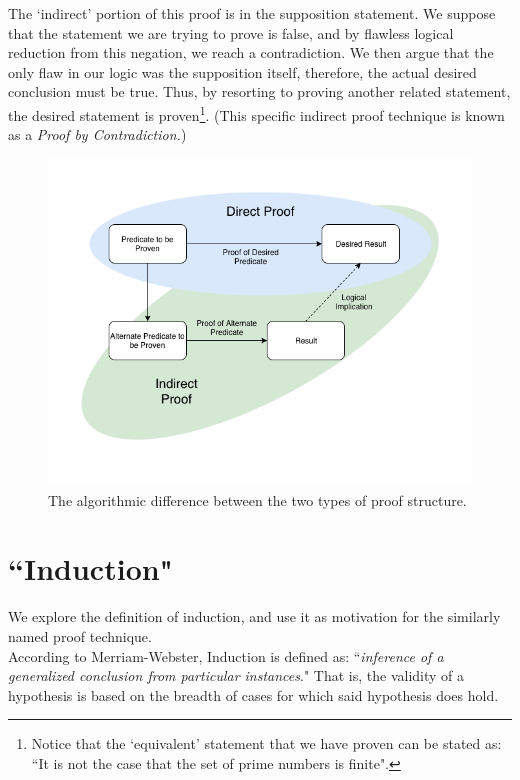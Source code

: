 \documentclass[10pt,a4paper,fleqn]{article}
\begin{document}
	The `indirect' portion of this proof is in the supposition statement. We suppose that the statement we are trying to prove is false, and by flawless logical reduction from this negation, we reach a contradiction. We then argue that the only flaw in our logic was the supposition itself, therefore, the actual desired conclusion must be true. Thus, by resorting to proving another related statement, the desired statement is proven\footnote{Notice that the `equivalent' statement that we have proven can be stated as: ``It is not the case that the set of prime numbers is finite".}. (This specific indirect proof technique is known as a \emph{Proof by Contradiction.})
	
	\begin{figure}[h]
		\centering
		\includegraphics[scale=0.45]{res/direct_indirect.png}
		\caption{The algorithmic difference between the two types of proof structure.}
	\end{figure}	
	
	\newpage
	
	\section{``Induction"}
	We explore the definition of induction, and use it as motivation for the similarly named proof technique. \\
	
	According to Merriam-Webster, Induction is defined as: ``\emph{inference of a generalized conclusion from particular instances}." That is, the validity of a hypothesis is based on the breadth of cases for which said hypothesis does hold.\\
	
\end{document}
